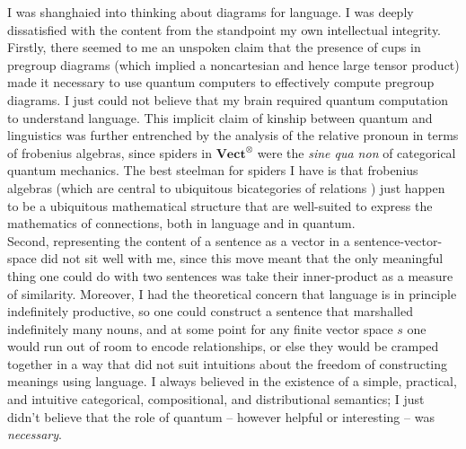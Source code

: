 I was shanghaied into thinking about diagrams for language. I was deeply dissatisfied with the content from the standpoint my own intellectual integrity. Firstly, there seemed to me an unspoken claim that the presence of cups in pregroup diagrams (which implied a noncartesian and hence large tensor product) made it necessary to use quantum computers to effectively compute pregroup diagrams. I just could not believe that my brain required quantum computation to understand language. This implicit claim of kinship between quantum and linguistics was further entrenched by the analysis of the relative pronoun in terms of frobenius algebras, since spiders in $\mathbf{Vect}^\otimes$ were the \emph{sine qua non} of categorical quantum mechanics. The best steelman for spiders I have is that frobenius algebras (which are central to ubiquitous bicategories of relations \citep{carboniCartesianBicategories1987b,carboniCartesianBicategoriesII2007}) just happen to be a ubiquitous mathematical structure that are well-suited to express the mathematics of connections, both in language and in quantum.\\

Second, representing the content of a sentence as a vector in a sentence-vector-space did not sit well with me, since this move meant that the only meaningful thing one could do with two sentences was take their inner-product as a measure of similarity. Moreover, I had the theoretical concern that language is in principle indefinitely productive, so one could construct a sentence that marshalled indefinitely many nouns, and at some point for any finite vector space $s$ one would run out of room to encode relationships, or else they would be cramped together in a way that did not suit intuitions about the freedom of constructing meanings using language. I always believed in the existence of a simple, practical, and intuitive categorical, compositional, and distributional semantics; I just didn't believe that the role of quantum -- however helpful or interesting -- was \emph{necessary}.

